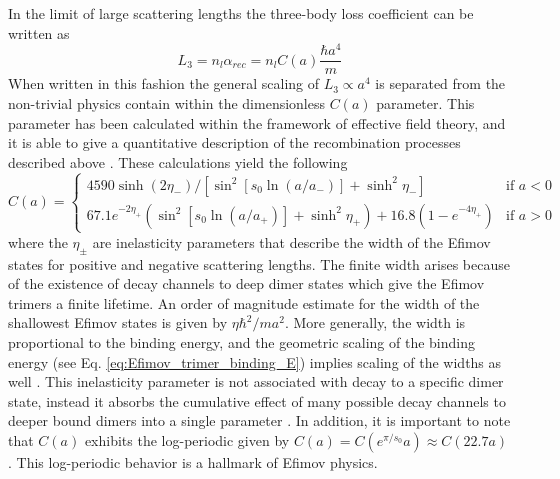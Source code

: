 \documentclass[prl,onecolumn,amsmath,amssymb,titlepage,nofootinbib,preprint]{revtex4-1}
\begin{document}
In the limit of large scattering lengths the three-body loss coefficient can be written as
	\begin{equation}\label{eq:3b_recombination}
		L_{3}=n_{l}\alpha_{rec}=n_{l}C(a)\frac{\hbar a^{4}}{m}
	\end{equation} 
When written in this fashion the general scaling of $L_{3}\propto a^{4}$ is separated from the non-trivial physics contain within the dimensionless $C(a)$ parameter.  This parameter has been calculated within the framework of effective field theory, and it is able to give a quantitative description of the recombination processes described above \cite{Braaten_2006}\cite{Bedaque2000}\cite{Braaten2001}\cite{Braaten2004}.  These calculations yield the following
	\begin{equation}\label{eq:C(a)}
		C(a)=\left\{\begin{array}{rl}
		4590\sinh(2\eta_{-})/[\sin^{2}[s_{0}\ln(a/a_{-})]+\sinh^{2}\eta_{-}] & \text{if } a<0\\
		67.1e^{-2\eta_{+}}(\sin^{2}[s_{0}\ln(a/a_{+})]+\sinh^{2}\eta_{+})+16.8(1-e^{-4\eta_{+}}) & \text{if } a>0
		\end{array}\right.
	\end{equation}
where the $\eta_{\pm}$ are inelasticity parameters that describe the width of the Efimov states for positive and negative scattering lengths.  The finite width arises because of the existence of decay channels to deep dimer states which give the Efimov  trimers a finite lifetime.  An order of magnitude estimate for the width of the shallowest Efimov states is given by $\eta\hbar^{2}/ma^{2}$.  More generally, the width is proportional to the binding energy, and the geometric scaling of the binding energy (see Eq. \ref{eq:Efimov_trimer_binding_E}) implies scaling of the widths as well \cite{Braaten2008}\cite{Nielsen2002}.  This inelasticity parameter is not associated with decay to a specific dimer state, instead it absorbs the cumulative effect of many possible decay channels to deeper bound dimers into a single parameter \cite{Braaten_2006}.  In addition, it is important to note that $C(a)$ exhibits the log-periodic given by $C(a)=C(e^{\pi/s_{0}}a)\approx C(22.7a)$.  This log-periodic behavior is a hallmark of Efimov physics.
	
\end{document}
